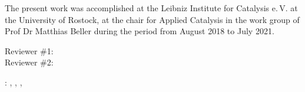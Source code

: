 
\thispagestyle{empty}


\noindent The present work was accomplished at the Leibniz Institute for Catalysis e.\,V. at the University of Rostock, at the chair for Applied Catalysis in the work group of Prof Dr Matthias Beller during the period from August 2018 to July 2021. \\

\hfill

\vfill

\noindent Reviewer \#1: \\

\noindent Reviewer \#2: \\

\bigskip

\noindent\myName: \textit{\myTitle}, \mySubtitle, \myDegree, \myTime









